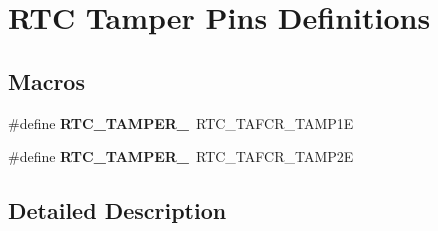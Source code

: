 \hypertarget{group___r_t_c_ex___tamper___pins___definitions}{}\section{R\+TC Tamper Pins Definitions}
\label{group___r_t_c_ex___tamper___pins___definitions}
\subsection*{Macros}
\begin{DoxyCompactItemize}
\item 
\mbox{\label{group___r_t_c_ex___tamper___pins___definitions_ga339f9515dea38efe31fbae679887c7b5}} 
\#define {\bfseries R\+T\+C\+\_\+\+T\+A\+M\+P\+E\+R\+\_}~R\+T\+C\+\_\+\+T\+A\+F\+C\+R\+\_\+\+T\+A\+M\+P1E
\item 
\mbox{\label{group___r_t_c_ex___tamper___pins___definitions_gaca7aa22d4151651fe8c7d272ed1749f9}} 
\#define {\bfseries R\+T\+C\+\_\+\+T\+A\+M\+P\+E\+R\+\_}~R\+T\+C\+\_\+\+T\+A\+F\+C\+R\+\_\+\+T\+A\+M\+P2E
\end{DoxyCompactItemize}


\subsection{Detailed Description}
